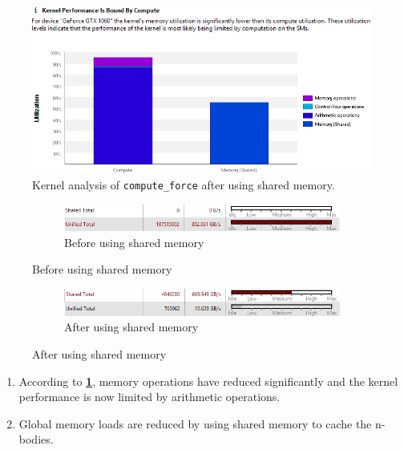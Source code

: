 \documentclass[12pt, a4paper]{article}
\let\oldcref\cref
\renewcommand{\cref}[1]{\textbf{\oldcref{#1}}}
\begin{document}
\begin{figure}[ht]
  \centering
  \includegraphics[width=\textwidth]{images/shared_mem_kernel_analysis_compute_force.png}
  \caption{Kernel analysis of \texttt{compute\_force} after using shared memory.}
  \label{figure:shared_mem_kernel_analysis_compute_force}
\end{figure}

\begin{figure}[ht]
  \begin{subfigure}{\textwidth}
    \centering
    \includegraphics[width=\textwidth]{images/bandwidth_before_shared_mem.png}
    \caption{Before using shared memory}
  \end{subfigure}
\end{figure}
\begin{figure}[ht] \ContinuedFloat
  \begin{subfigure}{\textwidth}
    \centering
    \includegraphics[width=\textwidth]{images/bandwidth_after_shared_mem.png}
    \caption{After using shared memory}
  \end{subfigure}
\end{figure}

\begin{enumerate}
  \item According to \cref{figure:shared_mem_kernel_analysis_compute_force}, memory operations have
  reduced significantly and the kernel performance is now limited by arithmetic operations.
  \item Global memory loads are reduced by using shared memory to cache the n-bodies.
\end{enumerate}
\end{document}
